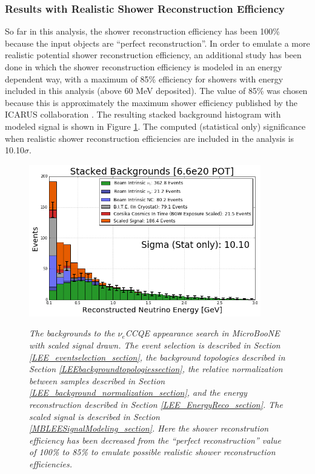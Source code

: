 \subsubsection{Results with Realistic Shower Reconstruction Efficiency}
So far in this analysis, the shower reconstruction efficiency has been 100\% because the input objects are ``perfect reconstruction''. In order to emulate a more realistic potential shower reconstruction efficiency, an additional study has been done in which the shower reconstruction efficiency is modeled in an energy dependent way, with a maximum of 85\% efficiency for showers with energy included in this analysis (above 60 MeV deposited). The value of 85\% was chosen because this is approximately the maximum shower efficiency published by the ICARUS collaboration \cite{ICARUS_showereff_source}. The resulting stacked background histogram with modeled signal is shown in Figure \ref{LEE_recoemu_fullstack_fig}. The computed (statistical only) significance when realistic shower reconstruction efficiencies are included in the analysis is 10.10$\sigma$.


\begin{figure}[ht!]
\centering
\includegraphics[width=0.9\textwidth]{Figures/LEE_recoemu_fullstack_WithAnalysisCuts.png}\\
\caption{\textit{The backgrounds to the $\nu_e$CCQE appearance search in MicroBooNE with scaled signal drawn. The event selection is described in Section \ref{LEE_eventselection_section}, the background topologies described in Section \ref{LEEbackgroundtopologiessection}, the relative normalization between samples described in Section \ref{LEE_background_normalization_section}, and the energy reconstruction described in Section \ref{LEE_EnergyReco_section}. The scaled signal is described in Section \ref{MBLEESignalModeling_section}. Here the shower reconstrution efficiency has been decreased from the ``perfect reconstruction'' value of 100\% to 85\% to emulate possible realistic shower reconstruction efficiencies.}}
\label{LEE_recoemu_fullstack_fig}
\end{figure}

